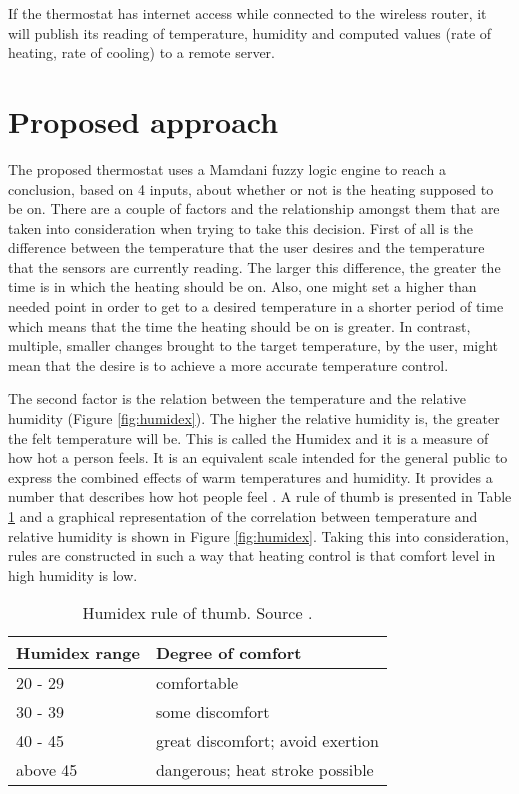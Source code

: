\documentclass[conference]{IEEEtran}
\let\Oldsection\section
\renewcommand{\section}{\FloatBarrier\Oldsection}
\begin{document}
If the thermostat has internet access while connected to the wireless router, it will publish its reading of
temperature, humidity and computed values (rate of heating, rate of cooling) to a remote server.

\section{Proposed approach}

The proposed thermostat uses a Mamdani fuzzy logic engine to reach a conclusion, based on 4 inputs, about
whether or not is the heating supposed to be on.
There are a couple of factors and the relationship amongst them that are taken into consideration when trying to
take this decision. First of all is the difference between the temperature that the user desires and the temperature
that the sensors are currently reading. The larger this difference, the greater the time is in which the heating
should be on. Also, one might set a higher than needed point in order to get to a desired temperature in a shorter
period of time which means that the time the heating should be on is greater. In contrast, multiple, smaller
changes brought to the target temperature, by the user, might mean that the desire is to achieve a more accurate
temperature control.

The second factor is the relation between the temperature and the relative humidity (Figure \ref{fig:humidex}).
The higher the relative humidity is, the greater the felt temperature will be. This is called the Humidex and
it is a measure of how hot a person feels. It is an equivalent scale intended for the general public to
express the combined effects of warm temperatures and humidity. It provides a number that describes how hot
people feel \cite{website:humidex}. A rule of thumb is presented in Table \ref{table:humidex_thumb} and a
graphical representation of the correlation between temperature and relative humidity is shown in Figure
\ref{fig:humidex}. Taking this into consideration, rules are constructed in such a way that heating control is
 that comfort level in high humidity is low.

\begin{center}
    \begin{table}[h!]
    \centering
    \begin{tabular}{| l | l |}
        \hline
        Humidex range & Degree of comfort  \\ \hline
        20 - 29 & comfortable \\ \hline
        30 - 39 & some discomfort \\ \hline
        40 - 45 & great discomfort; avoid exertion \\ \hline
        above 45 & dangerous; heat stroke possible \\ \hline
    \end{tabular}
    \caption[Humidex rule of thumb]{Humidex rule of thumb. Source \cite{website:humidex}.}
    \label{table:humidex_thumb}
    \end{table}
\end{center}
\end{document}
